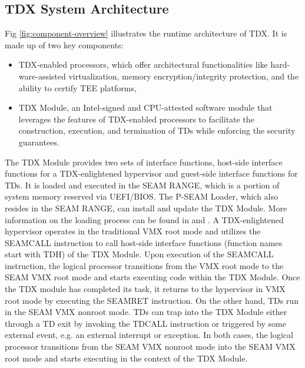 \subsection{TDX System Architecture}
Fig \ref{fig:component-overview} illustrates the runtime architecture of TDX. It is made up of two key components: 
\begin{itemize}
    \item TDX-enabled processors, which offer architectural functionalities like hard-ware-assisted virtualization, memory encryption/integrity protection, and the ability to certify TEE platforms,
    \item TDX Module, an Intel-signed and CPU-attested software module that leverages the features of TDX-enabled processors to facilitate the construction, execution, and termination of TDs while enforcing the security guarantees. 
\end{itemize} The TDX Module provides two sets of interface functions, host-side interface functions for a TDX-enlightened hypervisor and guest-side interface functions for TDs. It is loaded and executed in the SEAM RANGE, which is a portion of system memory reserved via UEFI/BIOS. The P-SEAM Loader, which also resides in the SEAM RANGE, can install and update the TDX Module. More information on the loading process can be found in \cite{white_paper_linux-substack1.5_nodate} and \cite{tdx-module-10-public-specpdf_nodate}.
A TDX-enlightened hypervisor operates in the traditional VMX root mode and utilizes the SEAMCALL instruction to call host-side interface functions (function names start with TDH) of the TDX Module. Upon execution of the SEAMCALL instruction, the logical processor transitions from the VMX root mode to the SEAM VMX root mode and starts executing code within the TDX Module. Once the TDX module has completed its task, it returns to the hypervisor in VMX root mode by executing the SEAMRET instruction. On the other hand, TDs run in the SEAM VMX nonroot mode. TDs can trap into the TDX Module either through a TD exit by invoking the TDCALL instruction or triggered by some external event, e.g. an external interrupt or exception. In both cases, the logical processor transitions from the SEAM VMX nonroot mode into the SEAM VMX root mode and starts executing in the context of the TDX Module.
